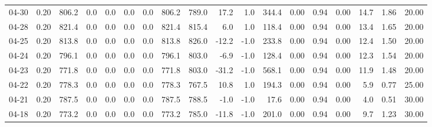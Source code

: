 \begin{threeparttable}
{\begin{tabular}{lrrrrrrrrrrrrrrrrr}
  04-30 &     0.20 & 806.2 &               0.0 &               0.0 &                0.0 &                0.0 & 806.2 & 789.0 &       17.2 &                      1.0 &               344.4 &       0.00 &      0.94 &           0.00 &             14.7 &            1.86 &                  20.00 \\
  04-28 &     0.20 & 821.4 &               0.0 &               0.0 &                0.0 &                0.0 & 821.4 & 815.4 &        6.0 &                      1.0 &               118.4 &       0.00 &      0.94 &           0.00 &             13.4 &            1.65 &                  20.00 \\
  04-25 &     0.20 & 813.8 &               0.0 &               0.0 &                0.0 &                0.0 & 813.8 & 826.0 &      -12.2 &                     -1.0 &               233.8 &       0.00 &      0.94 &           0.00 &             12.4 &            1.50 &                  20.00 \\
  04-24 &     0.20 & 796.1 &               0.0 &               0.0 &                0.0 &                0.0 & 796.1 & 803.0 &       -6.9 &                     -1.0 &               128.4 &       0.00 &      0.94 &           0.00 &             12.3 &            1.54 &                  20.00 \\
  04-23 &     0.20 & 771.8 &               0.0 &               0.0 &                0.0 &                0.0 & 771.8 & 803.0 &      -31.2 &                     -1.0 &               568.1 &       0.00 &      0.94 &           0.00 &             11.9 &            1.48 &                  20.00 \\
  04-22 &     0.20 & 778.3 &               0.0 &               0.0 &                0.0 &                0.0 & 778.3 & 767.5 &       10.8 &                      1.0 &               194.3 &       0.00 &      0.94 &           0.00 &              5.9 &            0.77 &                  25.00 \\
  04-21 &     0.20 & 787.5 &               0.0 &               0.0 &                0.0 &                0.0 & 787.5 & 788.5 &       -1.0 &                     -1.0 &                17.6 &       0.00 &      0.94 &           0.00 &              4.0 &            0.51 &                  30.00 \\
  04-18 &     0.20 & 773.2 &               0.0 &               0.0 &                0.0 &                0.0 & 773.2 & 785.0 &      -11.8 &                     -1.0 &               201.0 &       0.00 &      0.94 &           0.00 &              9.7 &            1.23 &                  30.00 \\

\end{tabular}}
\end{threeparttable}
